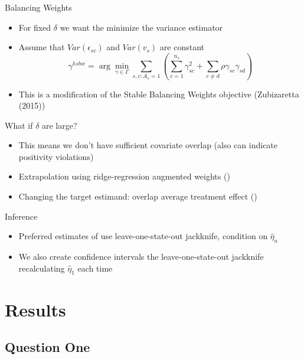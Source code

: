 \documentclass[hyperref={pdfpagelabels=false}]{beamer}
\begin{document}
\begin{frame}{Balancing Weights}
    \begin{itemize}
        \item For fixed $\delta$ we want the minimize the variance estimator \bigskip
        \item Assume that $Var(\epsilon_{sc})$ and $Var(v_s)$ are constant \bigskip
        $$
        \gamma^{hsbw} = \arg\min_{\gamma \in \Gamma}\sum_{s, c: A_s = 1}(\sum_{c = 1}^{n_s}\gamma_{sc}^2 + \sum_{c \ne d}\rho \gamma_{sc}\gamma_{sd})
        $$
        \item This is a modification of the Stable Balancing Weights objective (Zubizaretta (2015))
    \end{itemize}
\end{frame}

\begin{frame}{What if $\delta$ are large?}
    \begin{itemize}
        \item This means we don't have sufficient covariate overlap (also can indicate positivity violations) \bigskip
        \item Extrapolation using ridge-regression augmented weights (\cite{ben2018augmented}) \bigskip
        \item Changing the target estimand: overlap average treatment effect (\cite{li2018balancing})
    \end{itemize}
\end{frame}

\begin{frame}{Inference}
    \begin{itemize}
        \item Preferred estimates of use leave-one-state-out jackknife, condition on $\hat{\eta}_a$ \bigskip
        \item We also create confidence intervals the leave-one-state-out jackknife recalculating $\hat{\eta}_1$ each time \bigskip
    \end{itemize}
\end{frame}

\section{Results}

\subsection{Question One}
\end{document}
